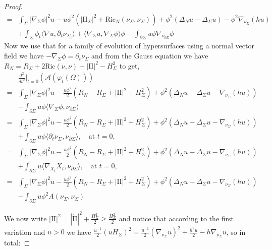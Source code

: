 \documentclass[12pt]{amsart}
\newcommand{\sff}{\mathrm{I\!I}}
\newcommand{\Ric}{\text{Ric}}
\newcommand{\p}{\partial}
\numberwithin{equation}{section}
\begin{document}
\begin{proof}
\begin{align*}
			=&\int_{\Sigma} |\nabla_{\Sigma} \phi|^2u  -u\phi^2(|\sff_{\Sigma}|^2+\Ric_N(\nu_{\Sigma},\nu_{\Sigma}))+ \phi^2 (\Delta_N u-\Delta_{\Sigma}u)-\phi^2\nabla_{\nu_{\Sigma}} (hu)\\
			&+ \int_{\Sigma} \phi_t \langle\nabla u,\p_t \nu_{\Sigma_t}\rangle +\langle \nabla_{\Sigma} u, \nabla_{\Sigma} \phi \rangle \phi   -\int_{\partial \Sigma} u\phi \nabla_{\nu_{\partial \Sigma}} \phi
		\end{align*}
		Now we use that for a family of evolution of hypersurfaces using a normal vector field we have $-\nabla_{\Sigma} \phi=\partial_t \nu_{\Sigma}$ and from the Gauss equation we have $R_N=R_{\Sigma}+2\Ric(\nu,\nu)+|\sff|^2-H^2_{\Sigma}$ to get,
		\begin{align*}
			&\frac{d^2}{dt^2}\Big\vert_{t=0}(\mathcal{A}(\varphi_t(\Omega)))\\
			=& \int_{\Sigma} |\nabla_{\Sigma} \phi|^2u  -\frac{u\phi^2}{2}(R_{N}-R_{\Sigma}+|\sff|^2+H^2_{\Sigma})+ \phi^2 (\Delta_N u-\Delta_{\Sigma}u-\nabla_{\nu_{\Sigma}} (hu))\\
			&-\int_{\partial \Sigma} u\phi \langle \nabla_{\Sigma}\phi, \nu_{\partial \Sigma}\rangle\\
			=&\int_{\Sigma} |\nabla_{\Sigma} \phi|^2u  -\frac{u\phi^2}{2}(R_{N}-R_{\Sigma}+|\sff|^2+H^2_{\Sigma})+ \phi^2 (\Delta_N u-\Delta_{\Sigma}u-\nabla_{\nu_{\Sigma}} (hu))\\
			&+ \int_{\partial \Sigma} u\phi \langle \partial_t \nu_{\Sigma}, \nu_{\p \Sigma} \rangle ,\quad \text{at } t=0, \\
			=&\int_{\Sigma} |\nabla_{\Sigma} \phi|^2u  -\frac{u\phi^2}{2}(R_{N}-R_{\Sigma}+|\sff|^2+H^2_{\Sigma})+ \phi^2 (\Delta_N u-\Delta_{\Sigma}u-\nabla_{\nu_{\Sigma}} (hu))\\
			& + \int_{\partial \Sigma} u  \langle \nabla_{X_t} X_t, \nu_{\p \Sigma} \rangle ,\quad \text{at } t=0, \\
			=&\int_{\Sigma} |\nabla_{\Sigma} \phi|^2u  -\frac{u\phi^2}{2}(R_{N}-R_{\Sigma}+|\sff|^2+H^2_{\Sigma})+ \phi^2 (\Delta_N u-\Delta_{\Sigma}u-\nabla_{\nu_{\Sigma}} (hu))\\
			& - \int_{\partial \Sigma} u  \phi^2 A(\nu_{\Sigma},\nu_{\Sigma})
		\end{align*}
		
		We now write $|\sff|^2=|\mathring{\sff}|^2+\frac{H^2_{\Sigma}}{2}\geq  \frac{H^2_{\Sigma}}{2}$ 
		and notice that according to the first variation and $u>0$ we have $\frac{u^{-1}}{2}(uH_{\Sigma})^2=\frac{u^{-1}}{2}(\nabla_{\nu_{\Sigma}}u)^2+\frac{h^2u}{2}-h\nabla_{\nu_{\Sigma}}u$, so in total:


\end{proof}
\end{document}
